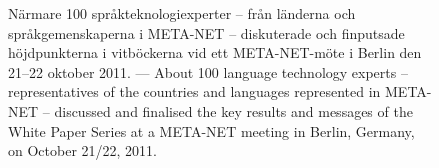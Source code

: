 \renewcommand*{\figureformat}{}
\renewcommand*{\captionformat}{}

\begin{figure}[htbp]
  \center
  \caption{Närmare 100 språkteknologiexperter -- från länderna och
    språkgemenskaperna i META-NET -- diskuterade och finputsade
    höjdpunkterna i vitböckerna vid ett META-NET-möte i Berlin den
    21--22 oktober 2011. --- \textcolor{grey1}{About 100 language
      technology experts -- representatives of the countries and
      languages represented in META-NET -- discussed and finalised the
      key results and messages of the White Paper Series at a META-NET
      meeting in Berlin, Germany, on October 21/22, 2011.}}
\end{figure}

\cleardoublepage

\label{whitepaperseries}

